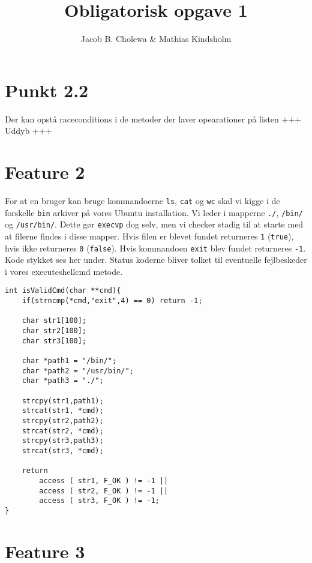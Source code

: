 \documentclass[danish]{report}
\title{Obligatorisk opgave 1}
\author{Jacob B. Cholewa \& Mathias Kindsholm }
\begin{document}
\maketitle



\section{Punkt 2.2}

Der kan opstå raceconditions i de metoder der laver opearationer på listen
+++ Uddyb +++ 


\section{Feature 2}

For at en bruger kan bruge kommandoerne {\tt ls}, {\tt cat} og {\tt wc} skal vi kigge i de forskelle {\tt bin} arkiver på vores Ubuntu installation. Vi leder i mapperne {\tt ./}, {\tt /bin/} og {\tt /usr/bin/}. Dette gør {\tt execvp} dog selv, men vi checker stadig til at starte med at filerne findes i disse mapper. Hvis filen er blevet fundet returneres {\tt 1} ({\tt true}), hvis ikke returneres {\tt 0} ({\tt false}). Hvis kommandoen {\tt exit} blev fundet returneres {\tt -1}. Kode stykket ses her under. Status koderne bliver tolket til eventuelle fejlbeskeder i vores executeshellcmd metode.

\begin{lstlisting}
int isValidCmd(char **cmd){
    if(strncmp(*cmd,"exit",4) == 0) return -1;

    char str1[100];
    char str2[100];
    char str3[100];

    char *path1 = "/bin/";
    char *path2 = "/usr/bin/";
    char *path3 = "./";

    strcpy(str1,path1);
    strcat(str1, *cmd);
    strcpy(str2,path2);
    strcat(str2, *cmd);
    strcpy(str3,path3);
    strcat(str3, *cmd);

    return 
        access ( str1, F_OK ) != -1 || 
        access ( str2, F_OK ) != -1 || 
        access ( str3, F_OK ) != -1;
}
\end{lstlisting}


\section{Feature 3}
\end{document}
